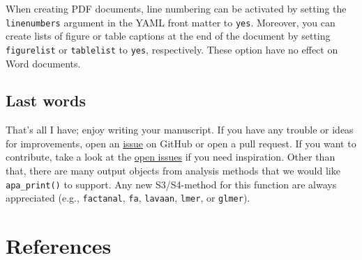 \documentclass[
  man,floatsintext]{apa6}
\begin{document}
When creating PDF documents, line numbering can be activated by setting the \texttt{linenumbers} argument in the YAML front matter to \texttt{yes}.
Moreover, you can create lists of figure or table captions at the end of the document by setting \texttt{figurelist} or \texttt{tablelist} to \texttt{yes}, respectively.
These option have no effect on Word documents.

\subsection{Last words}\label{last-words}

That's all I have; enjoy writing your manuscript.
If you have any trouble or ideas for improvements, open an \href{https://github.com/crsh/papaja/issues}{issue} on GitHub or open a pull request.
If you want to contribute, take a look at the \href{https://github.com/crsh/papaja/issues}{open issues} if you need inspiration.
Other than that, there are many output objects from analysis methods that we would like \texttt{apa\_print()} to support.
Any new S3/S4-method for this function are always appreciated (e.g., \texttt{factanal}, \texttt{fa}, \texttt{lavaan}, \texttt{lmer}, or \texttt{glmer}).

\section{References}\label{references}

\setlength{\parindent}{-0.5in}
\setlength{\leftskip}{0.5in}
\end{document}
